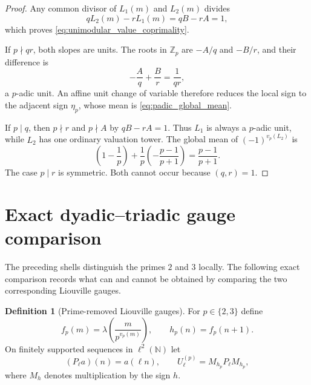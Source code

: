 \documentclass[11pt]{amsart}
\numberwithin{equation}{section}
\theoremstyle{plain}
\theoremstyle{definition}
\newtheorem{definition}[theorem]{Definition}
\theoremstyle{remark}
\newcommand{\N}{\mathbb N}
\newcommand{\Z}{\mathbb Z}
\newcommand{\liou}{\lambda}
\begin{document}
\begin{proof}
Any common divisor of $L_1(m)$ and $L_2(m)$ divides
\begin{equation}
qL_2(m)-rL_1(m)=qB-rA=1,
\label{eq:determinant_bezout}
\end{equation}
which proves \eqref{eq:unimodular_value_coprimality}.

If $p\nmid qr$, both slopes are units.  The roots in $\Z_p$ are $-A/q$ and $-B/r$, and their difference is
\begin{equation}
-\frac Aq+\frac Br=\frac1{qr},
\label{eq:root_difference_unit}
\end{equation}
a $p$-adic unit.  An affine unit change of variable therefore reduces the local sign to the adjacent sign $\eta_p$, whose mean is \eqref{eq:padic_global_mean}.

If $p\mid q$, then $p\nmid r$ and $p\nmid A$ by $qB-rA=1$.  Thus $L_1$ is always a $p$-adic unit, while $L_2$ has one ordinary valuation tower.  The global mean of $(-1)^{v_p(L_2)}$ is
\begin{equation}
\left(1-\frac1p\right)
+\frac1p\left(-\frac{p-1}{p+1}\right)
=\frac{p-1}{p+1}.
\label{eq:single_tower_mean}
\end{equation}
The case $p\mid r$ is symmetric.  Both cannot occur because $(q,r)=1$.
\end{proof}


\section{Exact dyadic--triadic gauge comparison}
\label{sec:dyadic_triadic_gauges}

The preceding shells distinguish the primes $2$ and $3$ locally.  The following exact comparison records what can and cannot be obtained by comparing the two corresponding Liouville gauges.

\begin{definition}[Prime-removed Liouville gauges]
\label{def:prime_removed_gauges}
For $p\in\{2,3\}$ define
\begin{equation}
f_p(m)=\liou\!\left(\frac{m}{p^{v_p(m)}}\right),
\qquad
h_p(n)=f_p(n+1).
\label{eq:fp_hp_definition}
\end{equation}
On finitely supported sequences in $\ell^2(\N)$ let
\begin{equation}
(P_\ell a)(n)=a(\ell n),
\qquad
U_\ell^{(p)}=M_{h_p}P_\ell M_{h_p},
\label{eq:gauge_operator_definition}
\end{equation}
where $M_h$ denotes multiplication by the sign $h$.
\end{definition}
\end{document}

